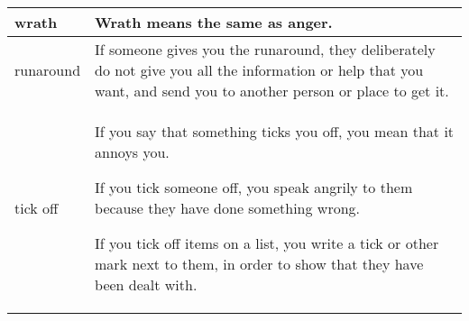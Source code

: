 \documentclass{article}
\begin{document}
\begin{center}
\begin{longtable}{|l|p{9cm}|}
\hline
wrath
&
Wrath means the same as anger.
\\

\hline
runaround
&
If someone gives you the runaround, they deliberately do not give you all the information or help that you want, and send you to another person or place to get it.
\\

\hline
tick off
&
If you say that something ticks you off, you mean that it annoys you.
\par
If you tick someone off, you speak angrily to them because they have done something wrong.
\par
If you tick off items on a list, you write a tick or other mark next to them, in order to show that they have been dealt with.
\\

\hline

\end{longtable}
\end{center}
\end{document}

